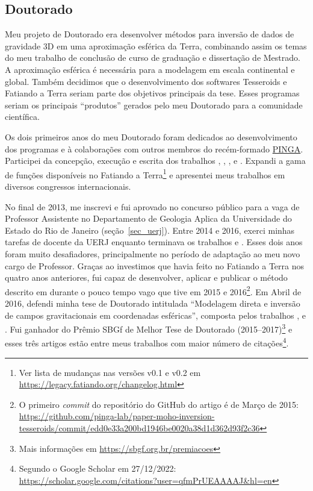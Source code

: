 \documentclass[10pt,a4paper,oneside]{book}
\newcommand{\UERJ}{Universidade do Estado do Rio de Janeiro}
\begin{document}
\subsection{Doutorado}

Meu projeto de Doutorado era desenvolver métodos para inversão de dados de
gravidade 3D em uma aproximação esférica da Terra, combinando assim os temas
do meu trabalho de conclusão de curso de graduação e dissertação de Mestrado.
A aproximação esférica é necessária para a modelagem em escala continental e
global.
Também decidimos que o desenvolvimento dos softwares Tesseroids e Fatiando a
Terra seriam parte dos objetivos principais da tese.
Esses programas seriam os principais ``produtos'' gerados pelo meu Doutorado
para a comunidade científica.

Os dois primeiros anos do meu Doutorado foram dedicados ao desenvolvimento dos
programas e à colaborações com outros membros do recém-formado
\href{https://www.pinga-lab.org}{PINGA}.
Participei da concepção, execução e escrita dos trabalhos
\citet{OliveiraJr2013}, \citet{Melo2013}, \citet{Carlos2014},
\citet{OliveiraJr2015} e \citet{Carlos2016}.
Expandi a gama de funções disponíveis no Fatiando a Terra\footnote{Ver lista
de mudanças nas versões v0.1 e v0.2 em \url{https://legacy.fatiando.org/changelog.html}}
e apresentei meus trabalhos em diversos congressos internacionais.

No final de 2013, me inscrevi e fui aprovado no concurso público para a vaga de
Professor Assistente no Departamento de Geologia Aplica da \UERJ
(seção~\ref{sec_uerj}).
Entre 2014 e 2016, exerci minhas tarefas de docente da UERJ enquanto terminava
os trabalhos \citet{Uieda2016} e \citet{Uieda2017}.
Esses dois anos foram muito desafiadores, principalmente no período de
adaptação ao meu novo cargo de Professor.
Graças ao investimos que havia feito no Fatiando a Terra nos quatro anos
anteriores, fui capaz de desenvolver, aplicar e publicar o método descrito em
\citet{Uieda2017} durante o pouco tempo vago que tive em 2015 e
2016\footnote{O primeiro \textit{commit} do repositório do GitHub do artigo é
de Março de 2015: \url{https://github.com/pinga-lab/paper-moho-inversion-tesseroids/commit/edd0e33a200bd1946be0020a38d1d362d93f2c36}}.
Em Abril de 2016, defendi minha tese de Doutorado intitulada ``Modelagem direta
e inversão de campos gravitacionais em coordenadas esféricas'', composta pelos
trabalhos \citet{Uieda2013}, \citet{Uieda2016} e \citet{Uieda2017}.
Fui ganhador do Prêmio SBGf de Melhor Tese de Doutorado
(2015--2017)\footnote{Mais informações em \url{https://sbgf.org.br/premiacoes}}
e esses três artigos estão entre meus trabalhos com maior número de
citações\footnote{Segundo o Google Scholar em 27/12/2022:
\url{https://scholar.google.com/citations?user=qfmPrUEAAAAJ&hl=en}}.
\end{document}
